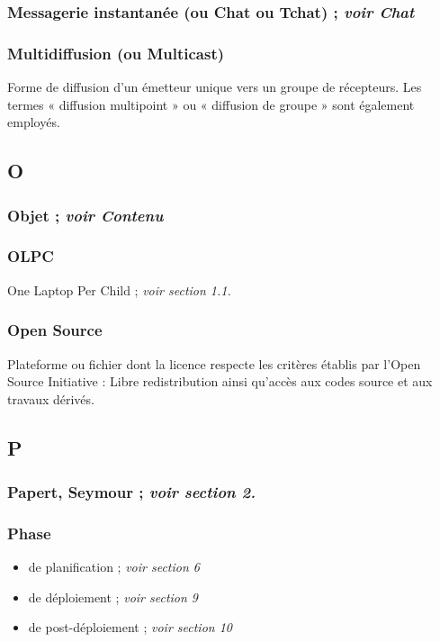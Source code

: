 \documentclass[12pt]{article}
\begin{document}
\subsubsection{Messagerie instantanée (ou Chat ou Tchat) ; \emph{voir Chat}}
\label{sec-14-11-2}
\subsubsection{Multidiffusion (ou Multicast)}
\label{sec-14-11-3}


Forme de diffusion d'un émetteur unique vers un groupe de récepteurs. Les
termes « diffusion multipoint » ou « diffusion de groupe » sont également
employés.
\subsection{O}
\label{sec-14-12}
\subsubsection{Objet ; \emph{voir Contenu}}
\label{sec-14-12-1}
\subsubsection{OLPC}
\label{sec-14-12-2}


One Laptop Per Child ; \emph{voir section 1.1.}
\subsubsection{Open Source}
\label{sec-14-12-3}


Plateforme ou fichier dont la licence respecte les critères établis par
l'Open Source Initiative : Libre redistribution ainsi qu'accès aux codes
source et aux travaux dérivés.
\subsection{P}
\label{sec-14-13}
\subsubsection{Papert, Seymour ; \emph{voir section 2.}}
\label{sec-14-13-1}
\subsubsection{Phase}
\label{sec-14-13-2}


\begin{itemize}
\item de planification ; \emph{voir section 6}
\item de déploiement ; \emph{voir section 9}
\item de post-déploiement ; \emph{voir section 10}
\end{itemize}
\end{document}
